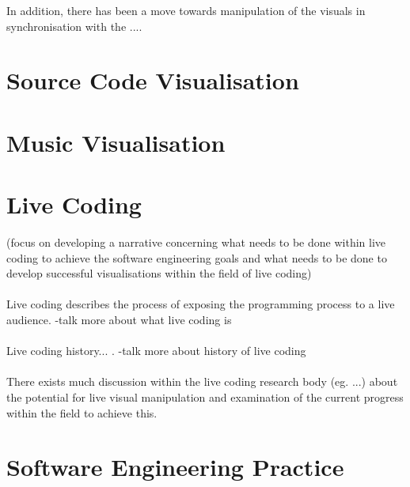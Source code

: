 
In addition, there has been a move towards manipulation of the visuals in synchronisation with the ....

\section{Source Code Visualisation}
\label{sec:musicvisualisation}

\section{Music Visualisation}
\label{sec:musicvisualisation}

\section{Live Coding}
\label{sec:livecoding}

(focus on developing a narrative concerning what needs to be done within live coding to achieve the software engineering goals and what needs to be done to develop successful visualisations within the field of live coding)
\\\\
Live coding describes the process of exposing the programming process to a live audience. -talk more about what live coding is
\\\\
Live coding history... . -talk more about history of live coding
\\\\
There exists much discussion within the live coding research body (eg. ...) about the potential for live visual manipulation and examination of the current progress within the field to achieve this.






\section{Software Engineering Practice}
\label{sec:softwareengineering}

